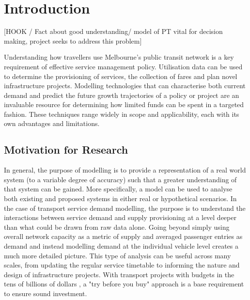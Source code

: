 \chapter{Introduction}
[HOOK / Fact about good understanding/ model of PT vital for decision making, project seeks to address this problem]

Understanding how travellers use Melbourne's public transit network is a key requirement of effective service management policy. Utilisation data can be used to determine the provisioning of services, the collection of fares and plan novel infrastructure projects. Modelling technologies that can characterise both current demand and predict the future growth trajectories of a policy or project are an invaluable resource for determining how limited funds can be spent in a targeted fashion. These techniques range widely in scope and applicability, each with its own advantages and limitations.

\section{Motivation for Research}
In general, the purpose of modelling is to provide a representation of a real world system (to a variable degree of accuracy) such that a greater understanding of that system can be gained. More specifically, a model can be used to analyse both existing and proposed systems in either real or hypothetical scenarios. In the case of transport service demand modelling, the purpose is to understand the interactions between service demand and supply provisioning at a level deeper than what could be drawn from raw data alone. Going beyond simply using overall network capacity as a metric of supply and averaged passenger entries as demand and instead modelling demand at the individual vehicle level creates a much more detailed picture. This type of analysis can be useful across many scales, from updating the regular service timetable to informing the nature and design of infrastructure projects. With transport projects with budgets in the tens of billions of dollars \cite[p.~12]{victorianparliamentarybudgetofficeSuburbanRailLoop2024}, a "try before you buy" approach is a base requirement to ensure sound investment.

